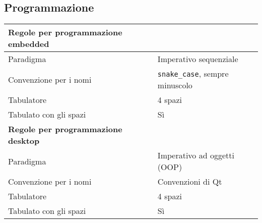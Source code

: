 \subsection{Programmazione}
\begin{table}[H] \centering
    \begin{tabularx}{\textwidth}{X l}
        \toprule
        \bfseries Regole per programmazione embedded & \\
        \midrule
        Paradigma & Imperativo sequenziale \\
        Convenzione per i nomi & \texttt{snake\_case}, sempre minuscolo \\
        Tabulatore & 4 spazi \\
        Tabulato con gli spazi & S\`i \\
        \midrule
        \bfseries Regole per programmazione desktop & \\
        \midrule
        Paradigma  & Imperativo ad oggetti (OOP) \\
        Convenzione per i nomi & Convenzioni di Qt \\
        Tabulatore & 4 spazi \\
        Tabulato con gli spazi & S\`i \\
        \bottomrule
    \end{tabularx}
\end{table}
